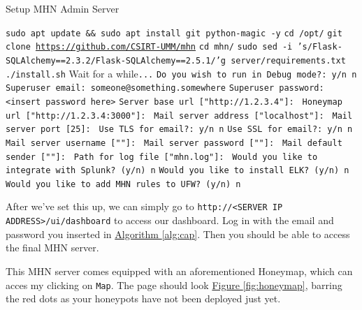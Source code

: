 \documentclass[12pt,usenames,dvipsnames]{iopart}
\newcommand{\reffig}[1]{\hyperref[#1]{Figure \ref*{#1}}}
\newcommand{\refalgo}[1]{\hyperref[#1]{Algorithm \ref*{#1}}}
\begin{document}
\begin{algorithm}[h]
\caption{Setup MHN Admin Server}\label{alg:cap}
\begin{algorithmic}[1]
\State \texttt{sudo apt update \&\& sudo apt install git python-magic -y}
\State \texttt{cd /opt/}
\State \texttt{git clone }\texttt{\url{https://github.com/CSIRT-UMM/mhn}} 
\State \texttt{cd mhn/}
\State \texttt{sudo sed -i 's/Flask-SQLAlchemy==2.3.2/Flask-SQLAlchemy==2.5.1/'g server/requirements.txt} 
\State \texttt{./install.sh}
\State Wait for a while\texttt{...}
\State \texttt{Do you wish to run in Debug mode?: y/n \textcolor{BlueGreen}{n}}
\State \texttt{Superuser email: \textcolor{BlueGreen}{someone@something.somewhere}} 
\State \texttt{Superuser password: \textcolor{BlueGreen}{<insert password here>}} 
\State \texttt{Server base url ["http://1.2.3.4"]: \keys{\return}}
\State \texttt{Honeymap url ["http://1.2.3.4:3000"]: \keys{\return}}
\State \texttt{Mail server address ["localhost"]: \keys{\return}}
\State \texttt{Mail server port [25]: \keys{\return}}
\State \texttt{Use TLS for email?: y/n \textcolor{BlueGreen}{n}}
\State \texttt{Use SSL for email?: y/n \textcolor{BlueGreen}{n}}
\State \texttt{Mail server username [""]: \keys{\return}}
\State \texttt{Mail server password [""]: \keys{\return}}
\State \texttt{Mail default sender [""]: \keys{\return}}
\State \texttt{Path for log file ["mhn.log"]: \keys{\return}}
\State \texttt{Would you like to integrate with Splunk? (y/n) \textcolor{BlueGreen}{n}}
\State \texttt{Would you like to install ELK? (y/n) \textcolor{BlueGreen}{n}}
\State \texttt{Would you like to add MHN rules to UFW? (y/n) \textcolor{BlueGreen}{n}}
\end{algorithmic}
\end{algorithm}

After we've set this up, we can simply go to \texttt{http://<SERVER IP ADDRESS>/ui/dashboard} to access our dashboard. Log in with the email and password you inserted in \refalgo{alg:cap}. Then you should be able to access the final MHN server. 

This MHN server comes equipped with an aforementioned Honeymap, which can acces my clicking on \texttt{Map}. The page should look \reffig{fig:honeymap}, barring the red dots as your honeypots have not been deployed just yet.
\end{document}
